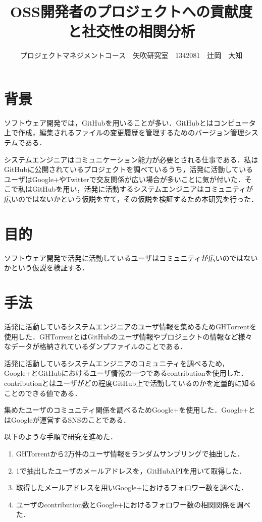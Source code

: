 \documentclass[uplatex,twocolumn,dvipdfmx]{jsarticle}
\title{\vspace{-5mm}\fontsize{14pt}{0pt}\selectfont OSS開発者のプロジェクトへの貢献度と社交性の相関分析}
\author{\normalsize プロジェクトマネジメントコース　矢吹研究室　1342081　辻岡　大知}
\date{}
\begin{document}
\fontsize{10.5pt}{\baselineskip}\selectfont
\maketitle





\section{背景}

ソフトウェア開発では，GitHubを用いることが多い．GitHubとはコンピュータ上で作成，編集されるファイルの変更履歴を管理するためのバージョン管理システムである．\cite{a}


システムエンジニアはコミュニケーション能力が必要とされる仕事である．私はGitHubに公開されているプロジェクトを調べているうち，活発に活動しているユーザはGoogle+やTwitterで交友関係が広い場合が多いことに気が付いた．そこで私はGitHubを用い，活発に活動するシステムエンジニアはコミュニティが広いのではないかという仮説を立て，その仮説を検証するため本研究を行った．


\section{目的}

ソフトウェア開発で活発に活動しているユーザはコミュニティが広いのではないかという仮説を検証する．

\section{手法}

活発に活動しているシステムエンジニアのユーザ情報を集めるためGHTorrentを使用した．GHTorrentとはGitHubのユーザ情報やプロジェクトの情報など様々なデータが格納されているダンプファイルのことである．

活発に活動しているシステムエンジニアのコミュニティを調べるため，Google+とGitHubにおけるユーザ情報の一つであるcontributionを使用した．contributionとはユーザがどの程度GitHub上で活動しているのかを定量的に知ることのできる値である．

集めたユーザのコミュニティ関係を調べるためGoogle+を使用した．Google+とはGoogleが運営するSNSのことである．

以下のような手順で研究を進めた．

\begin{enumerate}
 \item GHTorrentから2万件のユーザ情報をランダムサンプリングで抽出した．
 \item 1で抽出したユーザのメールアドレスを，GitHubAPIを用いて取得した．
 \item 取得したメールアドレスを用いGoogle+におけるフォロワー数を調べた．
 \item ユーザのcontribution数とGoogle+におけるフォロワー数の相関関係を調べた．
\end{enumerate}
\end{document}
